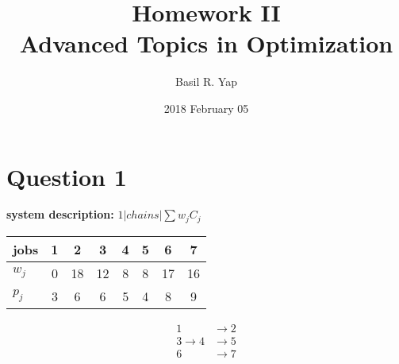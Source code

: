 \documentclass[a4paper, fleqn]{article}
\begin{document}
\title{Homework II \\ Advanced Topics in Optimization}
\author{Basil R. Yap}
\date{2018 February 05}
\maketitle

\section{Question 1}
\textbf{system description: }$1|chains|\sum w_jC_j$
\begin{center}
\begin{tabular}{| l | c | c | c | c | c | c | c |}
\hline
jobs & 1 & 2 & 3 & 4 & 5 & 6 & 7 \\
\hline
$w_j$ & 0 & 18 & 12 & 8 & 8 & 17 & 16 \\
$p_j$ & 3 & 6 & 6 & 5 & 4 & 8 & 9 \\
\hline
\end{tabular}
\end{center}
$$
\begin{aligned}
1&\rightarrow 2\\
3\rightarrow4&\rightarrow5\\
6&\rightarrow7
\end{aligned}
$$
\end{document}
